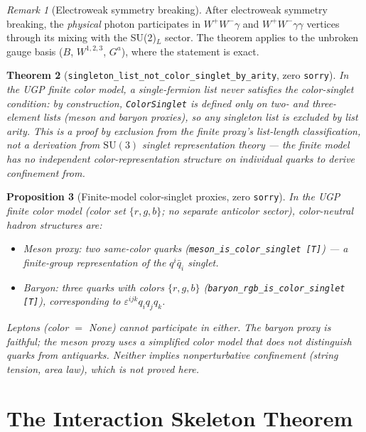 \documentclass[12pt]{article}
\newtheorem{theorem}{Theorem}[section]
\newtheorem{proposition}[theorem]{Proposition}
\theoremstyle{remark}
\newtheorem{remark}[theorem]{Remark}
\newcommand{\sorry}{\texttt{sorry}}
\newcommand{\lean}[1]{\texttt{#1}}
\begin{document}
\begin{remark}[Electroweak symmetry breaking]
After electroweak symmetry breaking, the \emph{physical} photon participates
in $W^+W^-\gamma$ and $W^+W^-\gamma\gamma$ vertices through its mixing with
the SU(2)$_L$ sector.  The theorem applies to the unbroken gauge basis
($B$, $W^{1,2,3}$, $G^a$), where the statement is exact.
\end{remark}

\begin{theorem}[\lean{singleton\_list\_not\_color\_singlet\_by\_arity}, zero \sorry]
In the UGP finite color model, a single-fermion list never satisfies the
color-singlet condition: \emph{by construction}, \lean{ColorSinglet} is defined
only on two- and three-element lists (meson and baryon proxies), so any
singleton list is excluded by list arity.  This is a proof by exclusion from
the finite proxy's list-length classification, not a derivation from
$\mathrm{SU}(3)$ singlet representation theory --- the finite model has no
independent color-representation structure on individual quarks to derive
confinement from.
\end{theorem}

\begin{proposition}[Finite-model color-singlet proxies, zero \sorry]
In the UGP finite color model (color set $\{r,g,b\}$; no separate anticolor
sector), color-neutral hadron structures are:
\begin{itemize}
  \item \emph{Meson proxy:} two same-color quarks
    (\lean{meson\_is\_color\_singlet [T]}) ---
    a finite-group representation of the $q^i\bar q_i$ singlet.
  \item \emph{Baryon:} three quarks with colors $\{r,g,b\}$
    (\lean{baryon\_rgb\_is\_color\_singlet [T]}),
    corresponding to $\varepsilon^{ijk}q_iq_jq_k$.
\end{itemize}
Leptons (color $=$ None) cannot participate in either.
The baryon proxy is faithful; the meson proxy uses a simplified color model that
does not distinguish quarks from antiquarks.  Neither implies nonperturbative
confinement (string tension, area law), which is not proved here.
\end{proposition}

\section{The Interaction Skeleton Theorem}
\label{sec:silver-gold}
\end{document}
